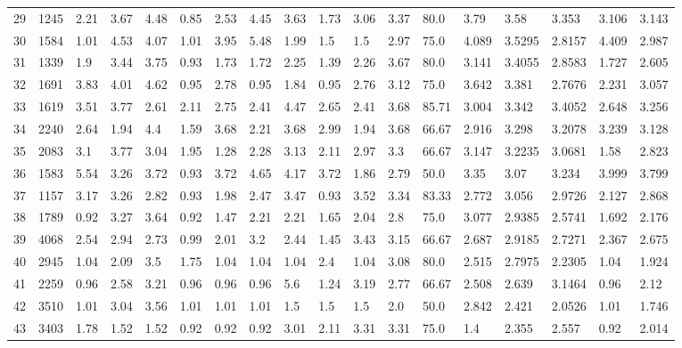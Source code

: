 \documentclass[landscape, 10pt]{report}
\begin{document}
\begin{longtable}{l || l || l | l | l | l | l | l | l | l | l | l | l || l | l | l | l | l}
\rowcolor{lightgray}29 & 1245 & 2.21 & 3.67 & 4.48 & 0.85 & 2.53 & 4.45 & 3.63 & 1.73 & 3.06 & 3.37 & 80.0 & 3.79 & 3.58 & 3.353 & 3.106 & 3.143\\ 
30 & 1584 & 1.01 & 4.53 & 4.07 & 1.01 & 3.95 & 5.48 & 1.99 & 1.5 & 1.5 & 2.97 & 75.0 & 4.089 & 3.5295 & 2.8157 & 4.409 & 2.987\\ 
\rowcolor{lightgray}31 & 1339 & 1.9 & 3.44 & 3.75 & 0.93 & 1.73 & 1.72 & 2.25 & 1.39 & 2.26 & 3.67 & 80.0 & 3.141 & 3.4055 & 2.8583 & 1.727 & 2.605\\ 
32 & 1691 & 3.83 & 4.01 & 4.62 & 0.95 & 2.78 & 0.95 & 1.84 & 0.95 & 2.76 & 3.12 & 75.0 & 3.642 & 3.381 & 2.7676 & 2.231 & 3.057\\ 
\rowcolor{lightgray}33 & 1619 & 3.51 & 3.77 & 2.61 & 2.11 & 2.75 & 2.41 & 4.47 & 2.65 & 2.41 & 3.68 & 85.71 & 3.004 & 3.342 & 3.4052 & 2.648 & 3.256\\ 
34 & 2240 & 2.64 & 1.94 & 4.4 & 1.59 & 3.68 & 2.21 & 3.68 & 2.99 & 1.94 & 3.68 & 66.67 & 2.916 & 3.298 & 3.2078 & 3.239 & 3.128\\ 
\rowcolor{lightgray}35 & 2083 & 3.1 & 3.77 & 3.04 & 1.95 & 1.28 & 2.28 & 3.13 & 2.11 & 2.97 & 3.3 & 66.67 & 3.147 & 3.2235 & 3.0681 & 1.58 & 2.823\\ 
36 & 1583 & 5.54 & 3.26 & 3.72 & 0.93 & 3.72 & 4.65 & 4.17 & 3.72 & 1.86 & 2.79 & 50.0 & 3.35 & 3.07 & 3.234 & 3.999 & 3.799\\ 
\rowcolor{lightgray}37 & 1157 & 3.17 & 3.26 & 2.82 & 0.93 & 1.98 & 2.47 & 3.47 & 0.93 & 3.52 & 3.34 & 83.33 & 2.772 & 3.056 & 2.9726 & 2.127 & 2.868\\ 
38 & 1789 & 0.92 & 3.27 & 3.64 & 0.92 & 1.47 & 2.21 & 2.21 & 1.65 & 2.04 & 2.8 & 75.0 & 3.077 & 2.9385 & 2.5741 & 1.692 & 2.176\\ 
\rowcolor{lightgray}39 & 4068 & 2.54 & 2.94 & 2.73 & 0.99 & 2.01 & 3.2 & 2.44 & 1.45 & 3.43 & 3.15 & 66.67 & 2.687 & 2.9185 & 2.7271 & 2.367 & 2.675\\ 
40 & 2945 & 1.04 & 2.09 & 3.5 & 1.75 & 1.04 & 1.04 & 1.04 & 2.4 & 1.04 & 3.08 & 80.0 & 2.515 & 2.7975 & 2.2305 & 1.04 & 1.924\\ 
\rowcolor{lightgray}41 & 2259 & 0.96 & 2.58 & 3.21 & 0.96 & 0.96 & 0.96 & 5.6 & 1.24 & 3.19 & 2.77 & 66.67 & 2.508 & 2.639 & 3.1464 & 0.96 & 2.12\\ 
42 & 3510 & 1.01 & 3.04 & 3.56 & 1.01 & 1.01 & 1.01 & 1.5 & 1.5 & 1.5 & 2.0 & 50.0 & 2.842 & 2.421 & 2.0526 & 1.01 & 1.746\\ 
\rowcolor{lightgray}43 & 3403 & 1.78 & 1.52 & 1.52 & 0.92 & 0.92 & 0.92 & 3.01 & 2.11 & 3.31 & 3.31 & 75.0 & 1.4 & 2.355 & 2.557 & 0.92 & 2.014\\ 

\end{longtable}
\end{document}
